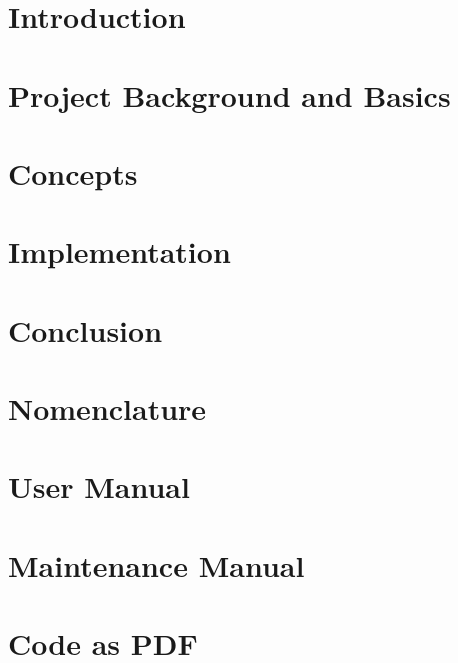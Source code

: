 \documentclass[11pt]{report}
\begin{document}
  
  
  
  
  
  \tableofcontents
  
  \chapter{Introduction}
  \label{cha:intro}
  
    
  
  \chapter{Project Background and Basics}
  \label{cha:background}
  
    
  
  \chapter{Concepts}
  \label{cha:concepts}
  
    
  
  \chapter{Implementation}
  \label{cha:impl}
  
    
    
  \chapter{Conclusion}
  \label{cha:conc}
  
    
  
  \begin{appendices}
    \chapter{Nomenclature}
    \label{cha:glossary}
    
      
    
    \chapter{User Manual}
    \label{cha:user}
      
      
    
    \chapter{Maintenance Manual}
    \label{cha:maint}
    
      
    
    \chapter{Code as PDF}
    \label{cha:code}
  \end{appendices}
    
    \clearpage
    \nocite{*} %
    
\end{document}
